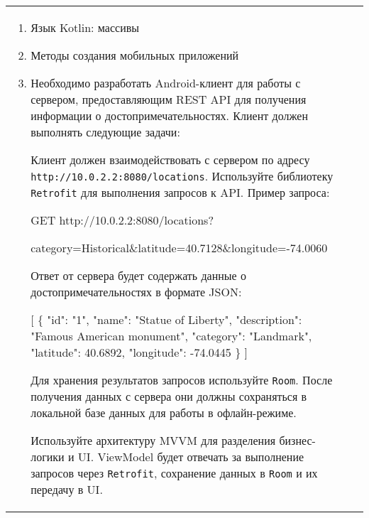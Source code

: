 \documentclass[a4paper]{article}
\begin{document}
\begin{tabular}{!{\vrule width 2pt}p{5cm}|p{6cm}|p{4cm}!{\vrule width 2pt}}
{\begin{minipage}{16cm}
\fontsize{14pt}{16pt}\selectfont\itshape
\begin{enumerate}
    \item Язык Kotlin: массивы
    \item Методы создания мобильных приложений
    \item %

Необходимо разработать Android-клиент для работы с сервером, предоставляющим REST API для получения информации о достопримечательностях. Клиент должен выполнять следующие задачи:


Клиент должен взаимодействовать с сервером по адресу \texttt{http://10.0.2.2:8080/locations}. Используйте библиотеку \texttt{Retrofit} для выполнения запросов к API. Пример запроса:

 GET http://10.0.2.2:8080/locations?

     category=Historical\&latitude=40.7128\&longitude=-74.0060 

Ответ от сервера будет содержать данные о достопримечательностях в формате JSON:

 [ \{ "id": "1", "name": "Statue of Liberty", "description": "Famous American monument",
     "category": "Landmark", "latitude": 40.6892, "longitude": -74.0445 \} ] 


Для хранения результатов запросов используйте \texttt{Room}. После получения данных с сервера они должны сохраняться в локальной базе данных для работы в офлайн-режиме.


Используйте архитектуру MVVM для разделения бизнес-логики и UI. ViewModel будет отвечать за выполнение запросов через \texttt{Retrofit}, сохранение данных в \texttt{Room} и их передачу в UI.


\end{enumerate}
\end{minipage}}
\end{tabular}
\end{document}
